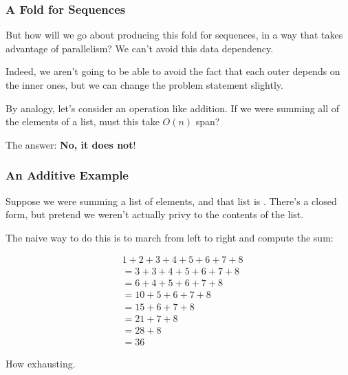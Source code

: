 \documentclass[aspectratio=169, handout]{beamer}
\begin{document}
\begin{frame}[fragile]
  \frametitle{A Fold for Sequences}

  But how will we go about producing this fold for sequences, in a way that
  takes advantage of parallelism? We can't avoid this data dependency.

  \pause
  \vspace{\fill}

  Indeed, we aren't going to be able to avoid the fact that each outer
   depends on the inner ones, but we can change the problem statement
  slightly.

  \pause
  \vspace{\fill}

  By analogy, let's consider an operation like addition. If we were summing
  all of the elements of a list, must this take $O(n)$ span?

  \pause
  \vspace{\fill}

  The answer: \textbf{No, it does not}!
\end{frame}

\begin{frame}[fragile]
  \frametitle{An Additive Example}

  Suppose we were summing a list of elements, and that list is
  \code{[1, 2, 3, 4, 5, 6, 7, 8]}. There's a closed form, but pretend
  we weren't actually privy to the contents of the list.

  \pause
  \vspace{\fill}

  The naive way to do this is to march from left to right and compute the sum:

  \pause
  \vspace{-15pt}

  \begin{align*}
    & 1 + 2 + 3 + 4 + 5 + 6 + 7 + 8 \\
    &= 3 + 3 + 4 + 5 + 6 + 7 + 8 \\
    &= 6 + 4 + 5 + 6 + 7 + 8 \\
    &= 10 + 5 + 6 + 7 + 8 \\
    &= 15 + 6 + 7 + 8 \\
    &= 21 + 7 + 8 \\
    &= 28 + 8 \\
    &= 36
  \end{align*}

  \pause
  \vspace{\fill}

  How exhausting.
\end{frame}
\end{document}
